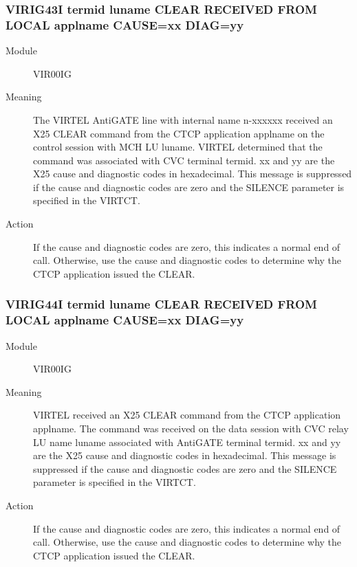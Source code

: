 \documentclass[letterpaper,10pt,english]{sphinxmanual}
\begin{document}
\subsubsection{VIRIG43I termid luname CLEAR RECEIVED FROM LOCAL applname CAUSE=xx DIAG=yy}
\label{\detokenize{messages:virig43i-termid-luname-clear-received-from-local-applname-cause-xx-diag-yy}}\begin{description}
\item[{Module}] \leavevmode
VIR00IG

\item[{Meaning}] \leavevmode
The VIRTEL AntiGATE line with internal name n-xxxxxx received an X25 CLEAR command from the CTCP application applname on the control session with MCH LU luname. VIRTEL determined that the command was associated with CVC terminal termid. xx and yy are the X25 cause and diagnostic codes in hexadecimal. This message is suppressed if the cause and diagnostic codes are zero and the SILENCE parameter is specified in the VIRTCT.

\item[{Action}] \leavevmode
If the cause and diagnostic codes are zero, this indicates a normal end of call. Otherwise, use the cause and diagnostic codes to determine why the CTCP application issued the CLEAR.

\end{description}


\subsubsection{VIRIG44I termid luname CLEAR RECEIVED FROM LOCAL applname CAUSE=xx DIAG=yy}
\label{\detokenize{messages:virig44i-termid-luname-clear-received-from-local-applname-cause-xx-diag-yy}}\begin{description}
\item[{Module}] \leavevmode
VIR00IG

\item[{Meaning}] \leavevmode
VIRTEL received an X25 CLEAR command from the CTCP application applname. The command was received on the data session with CVC relay LU name luname associated with AntiGATE terminal termid. xx and yy are the X25 cause and diagnostic codes in hexadecimal. This message is suppressed if the cause and diagnostic codes are zero and the SILENCE parameter is specified in the VIRTCT.

\item[{Action}] \leavevmode
If the cause and diagnostic codes are zero, this indicates a normal end of call. Otherwise, use the cause and diagnostic codes to determine why the CTCP application issued the CLEAR.

\end{description}
\end{document}
